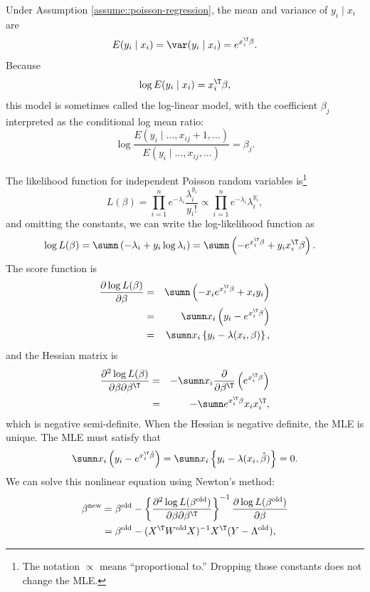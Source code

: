 Under Assumption \ref{assume::poisson-regression}, the mean and variance of $y_{i}\mid x_{i}$ are
\[
E(y_{i}\mid x_{i})=\var(y_{i}\mid x_{i})=e^{x_{i}^{\T}\beta}.
\]
Because 
\[
\log E(y_{i}\mid x_{i})=x_{i}^{\T}\beta,
\]
this model is sometimes called the log-linear model, with the coefficient
$\beta_{j}$ interpreted as the conditional log mean ratio:
\[
\log\frac{E(y_{i}\mid  \ldots,x_{ij}+1,\ldots )}{E(y_{i}\mid  \ldots,x_{ij},\ldots )}=\beta_{j}.
\]

The likelihood function for independent Poisson random variables is\footnote{The notation $\propto$ means ``proportional to.'' Dropping those constants does not change the MLE.}
\[
L(\beta)=\prod_{i=1}^{n}e^{-\lambda_{i}}\frac{\lambda_{i}^{y_{i}}}{y_{i}!}\propto\prod_{i=1}^{n}e^{-\lambda_{i}}\lambda_{i}^{y_{i}},
\]
and omitting the constants, we can write the log-likelihood function
as
\begin{align*}
\log L(\beta) & =\sumn\left(-\lambda_{i}+y_{i}\log\lambda_{i}\right)=\sumn\left(-e^{x_{i}^{\T}\beta}+y_{i}x_{i}^{\T}\beta\right).
\end{align*}
The score function is
\begin{eqnarray*}
\frac{\partial\log L(\beta)}{\partial\beta} 
&=& \sumn\left(-x_{i}e^{x_{i}^{\T}\beta}+x_{i}y_{i}\right) \\
&=& \sumn x_{i}\left(y_{i}-e^{x_{i}^{\T}\beta}\right) \\
&=&\sumn x_{i}\left\{ y_{i}-\lambda(x_{i},\beta)\right\} ,
\end{eqnarray*}
and the Hessian matrix is
\begin{eqnarray*}
\frac{\partial^{2}\log L(\beta)}{\partial\beta\partial\beta^{\T}} 
& = &-\sumn x_{i}\frac{\partial}{\partial\beta^{\T}}\left(e^{x_{i}^{\T}\beta}\right) \\
&=&-\sumn e^{x_{i}^{\T}\beta}x_{i}x_{i}^{\T}, 
\end{eqnarray*}
which is negative semi-definite. When the Hessian is negative definite,
the MLE is unique. The MLE must satisfy that
\[
\sumn x_{i}\left(y_{i}-e^{x_{i}^{\T}\hat{\beta}}\right)=\sumn x_{i}\left\{ y_{i}-\lambda(x_{i},\hat{\beta})\right\} =0.
\]
We can solve this nonlinear equation using Newton's method:
\begin{align*}
\beta^{\text{new}} & =\beta^{\text{old}}-\left\{ \frac{\partial^{2}\log L(\beta^{\text{old}})}{\partial\beta\partial\beta^{\T}}\right\} ^{-1}\frac{\partial\log L(\beta^{\text{old}})}{\partial\beta}\\
 & =\beta^{\text{old}}-(X^{\T}W^{\text{old}}X)^{-1}X^{\T}(Y-\Lambda^{\text{old}}),
\end{align*}
